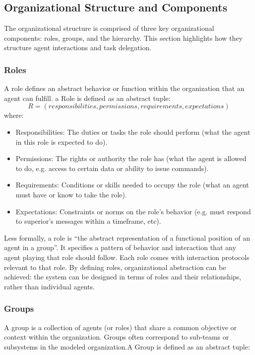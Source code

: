 


\subsection{Organizational Structure and Components}
The organizational structure is comprised of three key organizational components: roles, groups, and the hierarchy. This section highlights how they structure agent interactions and task delegation.
\subsubsection{Roles}
A role defines an abstract behavior or function within the organization that an agent can fulfill. a Role is defined as an abstract tuple:
\begin{equation*}
    R = (responsibilities, permissions, requirements, expectations)
\end{equation*}
where:
\begin{itemize}
    \item Responsibilities: The duties or tasks the role should perform (what the agent in this role is expected to do).
    \item Permissions: The rights or authority the role has (what the agent is allowed to do, e.g. access to certain data or ability to issue commands).
    \item Requirements: Conditions or skills needed to occupy the role (what an agent must have or know to take the role).
    \item Expectations: Constraints or norms on the role’s behavior (e.g. must respond to superior’s messages within a timeframe, etc).
\end{itemize}
Less formally, a role is “the abstract representation of a functional position of an agent in a group”. It specifies a pattern of behavior and interaction that any agent playing that role should follow. Each role comes with interaction protocols relevant to that role. By defining roles, organizational abstraction can be achieved: the system can be designed in terms of roles and their relationships, rather than individual agents.

\subsubsection{Groups}
A group is a collection of agents (or roles) that share a common objective or context within the organization. Groups often correspond to sub-teams or subsystems in the modeled organization.A Group is defined as an abstract tuple:

